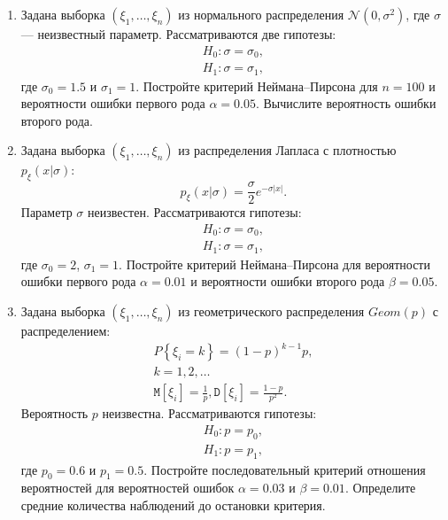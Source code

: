 \documentclass[a4paper,12pt]{article}
\newcommand{\expectation}[1]{\mathtt{M} \left[ #1 \right]}
\newcommand{\variance}[1]{\mathtt{D} \left[ #1 \right]}
\newcommand{\probability}[1]{P \left\{ #1 \right\}}
\newcommand{\modulus}[1]{\left | #1 \right |}
\begin{document}
\begin{enumerate}
      \item Задана выборка $\left( \xi_1, \dots, \xi_n \right)$ из нормального распределения $\mathcal{N}(0, \sigma^2)$, где $\sigma$ --- неизвестный
            параметр. Рассматриваются две гипотезы:
            \begin{gather*}
                  H_0: \sigma = \sigma_0 , \\
                  H_1: \sigma = \sigma_1 ,
            \end{gather*}
            где $\sigma_0 = 1.5$ и $\sigma_1 = 1$. Постройте критерий Неймана--Пирсона для $n = 100$ и вероятности ошибки первого рода $\alpha = 0.05$.
            Вычислите вероятность ошибки второго рода.

      \item Задана выборка $\left( \xi_1, \dots, \xi_n \right)$ из распределения Лапласа с плотностью $p_\xi(x | \sigma)$:
            \[
                  p_\xi(x | \sigma)
                  = \frac{\sigma}{2} e^{- \sigma \modulus{x}} .
            \]
            Параметр $\sigma$ неизвестен. Рассматриваются гипотезы:
            \begin{gather*}
                  H_0: \sigma = \sigma_0 , \\
                  H_1: \sigma = \sigma_1 ,
            \end{gather*}
            где $\sigma_0 = 2$, $\sigma_1 = 1$. Постройте критерий Неймана--Пирсона для вероятности ошибки первого рода $\alpha = 0.01$ и вероятности
            ошибки второго рода $\beta = 0.05$.

      \item Задана выборка $\left( \xi_1, \dots, \xi_n \right)$ из геометрического распределения $Geom(p)$ с распределением:
            \begin{gather*}
                  \probability{\xi_i = k} = (1-p)^{k-1} p, \\
                  k = 1, 2, \dots \\
                  \expectation{\xi_i} = \frac{1}{p} , \variance{\xi_i} = \frac{1-p}{p^2} .
            \end{gather*}
            Вероятность $p$ неизвестна. Рассматриваются гипотезы:
            \begin{gather*}
                  H_0: p = p_0 , \\
                  H_1: p = p_1 ,
            \end{gather*}
            где $p_0 = 0.6$ и $p_1 = 0.5$. Постройте последовательный критерий отношения вероятностей для вероятностей ошибок $\alpha = 0.03$
            и $\beta = 0.01$. Определите средние количества наблюдений до остановки критерия.



\end{enumerate}
\end{document}
